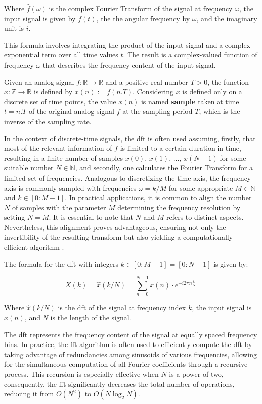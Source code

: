 Where $\hat{f}(\omega)$ is the complex Fourier Transform of the signal at frequency $\omega$, the input signal is given by $f(t)$, the the angular frequency by $\omega$, and the imaginary unit is $i$.

This formula involves integrating the product of the input signal and a complex exponential term over all time values $t$. The result is a complex-valued function of frequency $\omega$ that describes the frequency content of the input signal.

Given an analog signal $f : \mathbb{R} \rightarrow \mathbb{R}$ and a positive real number $T > 0$, the function $x : \mathbb{Z} \rightarrow \mathbb{R}$ is defined by $x(n):= f(n.T)$. Considering $x$ is defined only on a discrete set of time points, the value $x(n)$ is named \textbf{sample} taken at time $t = n.T$ of the original analog signal $f$ at the sampling period $T$, which is the inverse of the sampling rate.

In the context of discrete-time signals, the \gls{dft} is often used assuming, firstly, that most of the relevant information of $f$ is limited to a certain duration in time, resulting in a finite number of samples $x(0)$, $x(1)$, $\ldots$, $x(N-1)$ for some suitable number $N\in\mathbb{N} $, and secondly, one calculates the Fourier Transform for a limited set of frequencies. Analogous to discretizing the time axis, the frequency axis is commonly sampled with frequencies $\omega = k/M$ for some appropriate $M\in\mathbb{N} $ and $k \in [0: M-1]$. In practical applications, it is common to align the number $N$ of samples with the parameter $M$ determining the frequency resolution by setting $N = M$. It is essential to note that $N$ and $M$ refers to distinct aspects. Nevertheless, this alignment proves advantageous, ensuring not only the invertibility of the resulting transform but also yielding a computationally efficient algorithm \cite{Mueller2021}.

The formula for the \gls{dft} with integers $k \in[0:M-1]=[0:N-1]$ is given by:

\begin{equation}
    \label{eq:frmwk_audio_fund_dft}
    X(k) = \hat{x}(k / N)=\sum_{n=0}^{N-1} x(n) \cdot e^{-i 2 \pi n \frac{k}{N} }
\end{equation}

Where $\hat{x}(k/N)$ is the \gls{dft} of the signal at frequency index $k$, the input signal is $x(n)$, and $N$ is the length of the signal.

The \gls{dft} represents the frequency content of the signal at equally spaced frequency bins. In practice, the \gls{fft} algorithm is often used to efficiently compute the \gls{dft} by taking advantage of redundancies among sinusoids of various frequencies, allowing for the simultaneous computation of all Fourier coefficients through a recursive process. This recursion is especially effective when $N$ is a power of two, consequently, the \gls{fft} significantly decreases the total number of operations, reducing it from $O(N^2)$ to $O(N \log_2 N)$.

